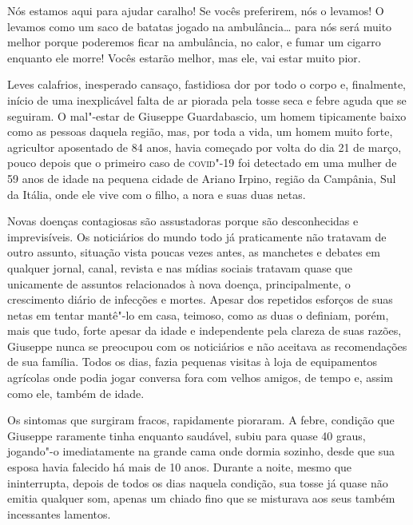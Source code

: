 

\epigraph{Nós estamos aqui para ajudar caralho! Se vocês preferirem, nós o
levamos! O levamos como um saco de batatas jogado na ambulância\ldots{} para
nós será muito melhor porque poderemos ficar na ambulância, no calor, e
fumar um cigarro enquanto ele morre! Vocês estarão melhor, mas ele, vai
estar muito pior.}{}

Leves calafrios, inesperado cansaço, fastidiosa dor por todo o corpo e,
finalmente, início de uma inexplicável falta de ar piorada pela tosse
seca e febre aguda que se seguiram. O mal"-estar de Giuseppe
Guardabascio, um homem tipicamente baixo como as pessoas daquela região,
mas, por toda a vida, um homem muito forte, agricultor aposentado de 84
anos, havia começado por volta do dia 21 de março, pouco depois que o
primeiro caso de \textsc{covid}"-19 foi detectado em uma mulher de 59 anos de
idade na pequena cidade de Ariano Irpino, região da Campânia, Sul da
Itália, onde ele vive com o filho, a nora e suas duas netas.

Novas doenças contagiosas são assustadoras porque são desconhecidas e
imprevisíveis. Os noticiários do mundo todo já praticamente não tratavam
de outro assunto, situação vista poucas vezes antes, as manchetes e
debates em qualquer jornal, canal, revista e nas mídias sociais tratavam
quase que unicamente de assuntos relacionados à nova doença,
principalmente, o crescimento diário de infecções e mortes. Apesar dos
repetidos esforços de suas netas em tentar mantê"-lo em casa, teimoso,
como as duas o definiam, porém, mais que tudo, forte apesar da idade e
independente pela clareza de suas razões, Giuseppe nunca se preocupou
com os noticiários e não aceitava as recomendações de sua família. Todos
os dias, fazia pequenas visitas à loja de equipamentos agrícolas onde
podia jogar conversa fora com velhos amigos, de tempo e, assim como ele,
também de idade.

Os sintomas que surgiram fracos, rapidamente pioraram. A febre, condição
que Giuseppe raramente tinha enquanto saudável, subiu para quase 40
graus, jogando"-o imediatamente na grande cama onde dormia sozinho, desde
que sua esposa havia falecido há mais de 10 anos. Durante a noite, mesmo
que ininterrupta, depois de todos os dias naquela condição, sua tosse já
quase não emitia qualquer som, apenas um chiado fino que se misturava
aos seus também incessantes lamentos.

